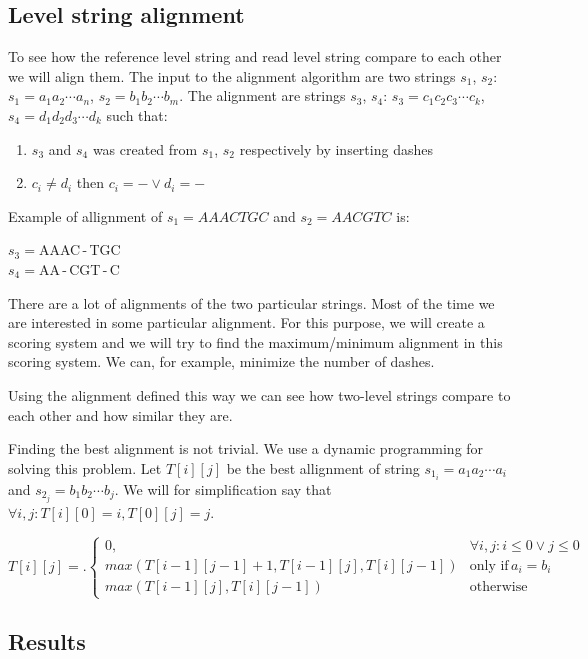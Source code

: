 \subsection{Level string alignment}

To see how the reference level string and read level string compare to each other
we will align them. The input to the alignment algorithm are two strings $s_1$, $s_2$:
$s_1=a_1a_2\cdots a_n$, $s_2=b_1b_2\cdots b_m$. The alignment are strings
$s_3$, $s_4$: $s_3 = c_1c_2c_3\cdots c_k$, $s_4 = d_1d_2d_3\cdots d_k$
such that:

\begin{enumerate}
\item $s_3$ and $s_4$ was created from $s_1$, $s_2$ respectively by inserting dashes
\item $c_i \neq d_i$ then $c_i = - \lor d_i = -$
\end{enumerate}

Example of allignment of $s_1 = AAACTGC$ and $s_2 = AACGTC$ is:

\begin{center}
$s_3 = $AAAC\,-\,TGC\\
$s_4 = $AA\,-\,CGT\,-\,C
\end{center}

There are a lot of alignments of the two particular strings. Most of the time we
are interested in some particular alignment. For this purpose, we will create a
scoring system and we will try to find the maximum/minimum alignment in this scoring
system. We can, for example, minimize the number of dashes.

Using the alignment defined this way we can see how two-level strings compare to
each other and how similar they are.

Finding the best alignment is not trivial. We use a dynamic programming for
solving this problem. Let $T[i][j]$ be the best allignment of string $s_{1_i} = a_1a_2\cdots a_i$
and $s_{2_j} = b_1b_2\cdots b_j$. We will for simplification say that $\forall i, j: T[i][0] = i, T[0][j] = j$.

\[
T[i][j] = \bigl.
  \begin{cases}
    0, & \forall i,j : i\leq 0 \lor j\leq 0 \\
    max(T[i-1][j-1] + 1, T[i-1][j], T[i][j-1]) & \text{only if} \, a_i = b_i \\ 
    max(T[i-1][j], T[i][j-1]) & \text{otherwise}
  \end{cases}
\]

\subsection{Results}

